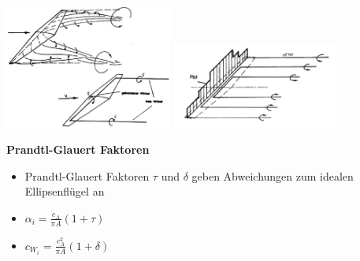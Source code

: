 \documentclass[8pt, landscape, fleqn]{scrartcl}
\begin{document}
\begin{multicols*}{3}
\begin{center}
    \includegraphics[width=5.5cm]{Wirbelsystem_einfaches_Hufeisenmodell.png}
    \includegraphics[width=5.5cm]{Prandtl_Wirbelmodell.png}
\end{center}

\textbf{Prandtl-Glauert Faktoren}

\begin{itemize}
    \item Prandtl-Glauert Faktoren $\tau$ und $\delta$ geben Abweichungen zum idealen Ellipsenflügel an 
    \item $\alpha_i = \frac{c_A}{\pi A}(1+\tau)$
    \item $c_{W_i} = \frac{c_A^2}{\pi A}(1+\delta)$
\end{itemize}


\end{multicols*}
\end{document}
